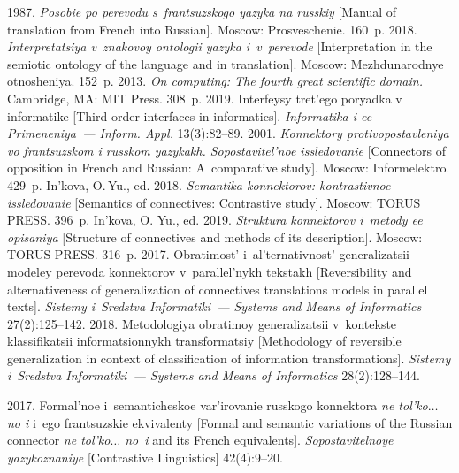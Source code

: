 \begin{multicols}{2}
{{\begin{thebibliography}{99}
 1987. \textit{Posobie po perevodu s~frantsuzskogo yazyka na russkiy} [Manual of 
translation from French into Russian]. Moscow: Prosveschenie. 160~p.
 2018. \textit{Interpretatsiya v~znakovoy ontologii yazyka i~v~perevode} [Interpretation 
in the semiotic ontology of the language and in translation]. Moscow: Mezhdunarodnye otnosheniya. 152~p.
 2013. \textit{On computing: 
The fourth great scientific domain.} Cambridge, MA: MIT Press. 
308~p.
 2019. Interfeysy tret'ego poryadka v informatike [Third-order interfaces in informatics]. 
\textit{Informatika i ee Primeneniya~--- Inform. Appl.} 13(3):82--89.
 2001. \textit{Konnektory protivopostavleniya vo frantsuzskom i russkom 
yazykakh. Sopostavitel'noe issledovanie} [Connectors of opposition in French and Russian: A~comparative 
study]. Moscow: Informelektro. 429~p.
In'kova, O.\,Yu., ed. 2018. \textit{Semantika konnektorov: kontrastivnoe issledovanie} [Semantics of 
connectives: Contrastive study]. Moscow: TORUS PRESS. 396~p.
In'kova, O. Yu., ed. 2019. \textit{Struktura konnektorov i~metody ee opisaniya} [Structure of connectives and 
methods of its description]. Moscow: TORUS PRESS. 316~p.
 2017. Obratimost' i~al'ternativnost' 
generalizatsii modeley perevoda konnektorov v~parallel'nykh tekstakh [Reversibility and alternativeness of 
generalization of connectives translations models in parallel texts]. \textit{Sistemy i~Sredstva Informatiki~--- 
Systems and Means of Informatics} 27(2):125--142.
 2018. Metodologiya obratimoy ge\-ne\-ra\-li\-za\-tsii 
v~kontekste klassifikatsii informatsionnykh 
transformatsiy [Methodology of reversible generalization in context of classification of information 
transformations]. \textit{Sistemy i~Sredstva Informatiki~--- Systems and 
Means of Informatics} 28(2):128--144.

 2017. Formal'noe i~semanticheskoe var'irovanie russkogo konnektora \textit{ne 
tol'ko$\ldots$ no i} i~ego frantsuzskie ekvivalenty [Formal and semantic variations of the Russian connector 
\textit{ne tol'ko$\ldots$ no~i} and its French equivalents]. 
\textit{Sopostavitelnoye yazykoznaniye} 
[Contrastive Linguistics] 42(4):9--20.


\end{thebibliography}}}
\end{multicols}
